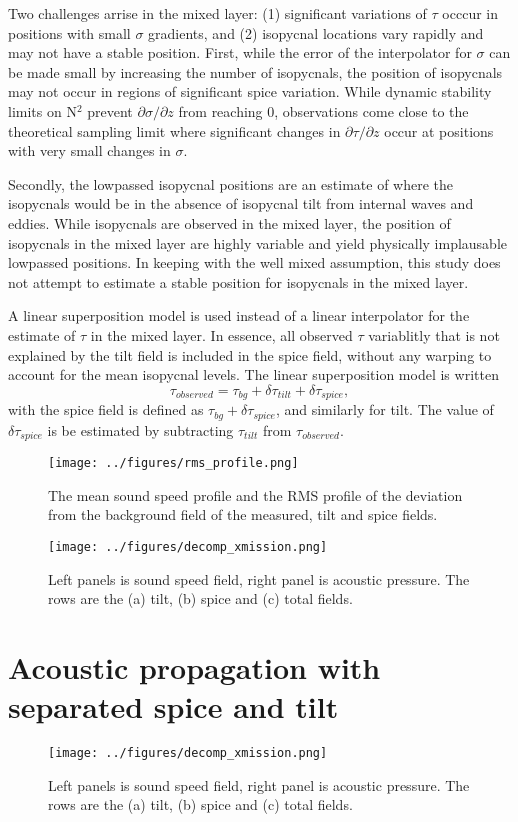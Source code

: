 \documentclass[preprint]{JASA}
\begin{document}
Two challenges arrise in the mixed layer: (1) significant variations of $\tau$ occcur in positions with small $\sigma$ gradients, and (2) isopycnal locations vary rapidly and may not have a stable position. First, while the error of the interpolator for $\sigma$ can be made small by increasing the number of isopycnals, the position of isopycnals may not occur in regions of significant spice variation. While dynamic stability limits on N$^2$ prevent $\partial \sigma / \partial z$ from reaching 0, observations come close to the theoretical sampling limit where significant changes in $\partial \tau / \partial z$ occur at positions with very small changes in $\sigma$.

Secondly, the lowpassed isopycnal positions are an estimate of where the isopycnals would be in the absence of isopycnal tilt from internal waves and eddies. While isopycnals are observed in the mixed layer, the position of isopycnals in the mixed layer are highly variable and yield physically implausable lowpassed positions. In keeping with the well mixed assumption, this study does not attempt to estimate a stable position for isopycnals in the mixed layer.

A linear superposition model is used instead of a linear interpolator for the estimate of $\tau$ in the mixed layer. In essence, all observed $\tau$ variablitly that is not explained by the tilt field is included in the spice field, without any warping to account for the mean isopycnal levels. The linear superposition model is written
\begin{equation}
    \tau_{observed} = \tau_{bg} + \delta \tau_{tilt} + \delta \tau_{spice},
\end{equation}
with the spice field is defined as $\tau_{bg} + \delta \tau_{spice}$, and similarly for tilt. The value of $\delta \tau_{spice}$ is be estimated by subtracting $\tau_{tilt}$ from $\tau_{observed}$.

\begin{figure}
\texttt{[image: ../figures/rms\_profile.png]}
    \caption{\label{fig:c_rms}{The mean sound speed profile and the RMS profile of the deviation from the background field of the measured, tilt and spice fields. }}
\end{figure}

\begin{figure}
\texttt{[image: ../figures/decomp\_xmission.png]}
    \caption{\label{fig:decomp_x}{Left panels is sound speed field, right panel is acoustic pressure. The rows are the (a) tilt, (b) spice and (c) total fields.}}
\end{figure}

\section{\label{sec:propagation}Acoustic propagation with separated spice and tilt}
\begin{figure}
\texttt{[image: ../figures/decomp\_xmission.png]}
    \caption{\label{fig:decomp_x}{Left panels is sound speed field, right panel is acoustic pressure. The rows are the (a) tilt, (b) spice and (c) total fields.}}
\end{figure}




\end{document}
